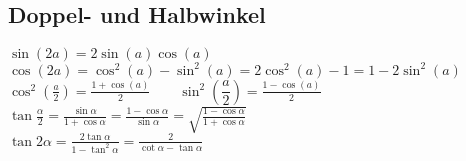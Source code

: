 \subsection{Doppel- und Halbwinkel}	
	$\sin(2a)=2\sin(a)\cos(a)$\\
	$\cos(2a)=\cos^2(a)-\sin^2(a)=2\cos^2(a)-1=1-2\sin^2(a)$\\
	$\cos^2 \left(\frac{a}{2}\right)=\frac{1+\cos(a)}{2} \qquad
	\sin^2 \left(\dfrac{a}{2}\right)=\frac{1-\cos(a)}{2}$ \\
	$\tan\frac{\alpha}{2} = \frac{\sin \alpha}{1 + \cos \alpha} = \frac{1- \cos \alpha}{\sin \alpha} = \sqrt{\frac{1 - \cos \alpha}{1 + \cos \alpha}}$ \\
	$\tan 2 \alpha = \frac{2 \tan \alpha}{1 - \tan^2 \alpha} = \frac{2}{\cot \alpha - \tan \alpha}$ \\